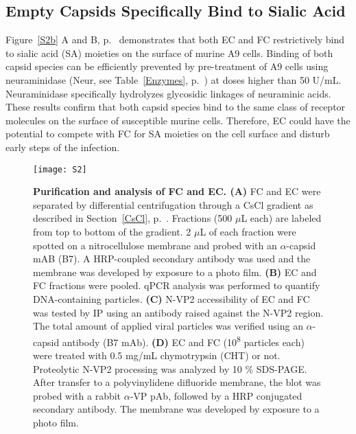 \subsection{Empty Capsids Specifically Bind to Sialic Acid}

Figure~\ref{S2b} A and B, p.~\pageref{S2b} demonstrates that both EC and FC restrictively bind to sialic acid (SA) moieties on the surface of murine A9 cells. Binding of both capsid species can be efficiently prevented by pre-treatment of A9 cells using neuraminidase (Neur, see Table~\ref{Enzymes}, p.~\pageref{Enzymes}) at doses higher than 50 U/mL. Neuraminidase specifically hydrolyzes glycosidic linkages of neuraminic acids. These results confirm that both capsid species bind to the same class of receptor molecules on the surface of susceptible murine cells. Therefore, EC could have the potential to compete with FC for SA moieties on the cell surface and disturb early steps of the infection.            

\renewcommand\thempfootnote{\arabic{mpfootnote}}


\begin{figure}[t]
\centering
\texttt{[image: S2]} \\[0.3cm]
\caption[Purification and Analysis of Full Capsids and Empty Capsids]
{\textbf{Purification and analysis of FC and EC. (A)} FC and EC were separated by differential centrifugation through a CsCl gradient as described in Section~\ref{CsCl}, p.~\pageref{CsCl}. Fractions (500 $\mu$L each) are labeled from top to bottom of the gradient. 2 $\mu$L of each fraction were spotted on a nitrocellulose membrane and probed with an $\alpha$-capsid mAB (B7). A HRP-coupled secondary antibody was used and the membrane was developed by exposure to a photo film. \textbf{(B)} EC and FC fractions were pooled. qPCR analysis was performed to quantify DNA-containing particles. \textbf{(C)} N-VP2 accessibility of EC and FC was tested by IP using an antibody raised against the N-VP2 region. The total amount of applied viral particles was verified using an $\alpha$-capsid antibody (B7 mAb). \textbf{(D)} EC and FC (10\textsuperscript{8} particles each) were treated with 0.5 mg/mL chymotrypsin (CHT) or not. Proteolytic N-VP2 processing was analyzed by 10 \% SDS-PAGE. After transfer to a polyvinylidene difluoride membrane, the blot was probed with a rabbit $\alpha$-VP pAb, followed by a HRP conjugated secondary antibody. The membrane was developed by exposure to a photo film.} 
\label{S2}
\end{figure}

